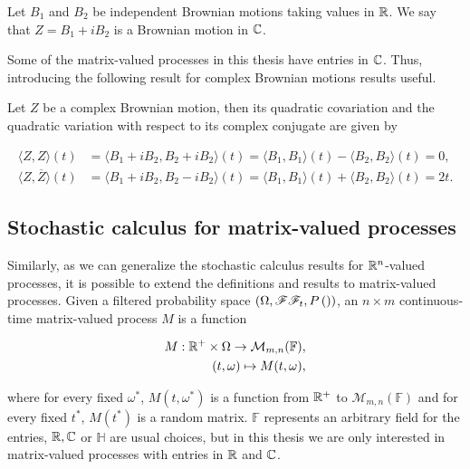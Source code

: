 \begin{example}
    Let $B_1$ and $B_2$ be independent Brownian motions taking values in $\mathbb R$. We say that $Z = B_1 + i B_2$ is a Brownian motion in $\mathbb C$.
\end{example}

Some of the matrix-valued processes in this thesis have entries in $\mathbb C$. Thus, introducing the following result for complex Brownian motions results useful.

\begin{theorem}
    Let $Z$ be a complex Brownian motion, then its quadratic covariation and the quadratic variation with respect to its complex conjugate are given by

    \begin{align*}
        \langle Z, Z \rangle(t) &= \langle B_1 + i B_2, B_2 + i B_2\rangle(t) = \langle B_1, B_1 \rangle(t) - \langle B_2, B_2 \rangle(t) = 0, \\ 
        \langle Z, \overline{Z} \rangle (t) &= \langle B_1 + i B_2, B_2 - i B_2\rangle(t) = \langle B_1, B_1 \rangle(t) + \langle B_2, B_2 \rangle(t) = 2t.
    \end{align*}
\end{theorem}




\subsection{Stochastic calculus for matrix-valued processes}

Similarly, as we can generalize the stochastic calculus results for $\mathbb R^n$-valued processes, it is possible to extend the definitions and results to matrix-valued processes. Given a filtered probability space $(\Omega, \mathscr F \mathscr F_t, P\left( ) \right)$, an $n\times m$ continuous-time matrix-valued process $M$ is a function

\begin{align*}
    M : \mathbb R^+ \times \Omega \to \mathcal M_{m,n}(\mathbb F),\\ 
    (t,\omega) \mapsto M(t,\omega),
\end{align*}

\noindent where for every fixed $\omega^*$, $M(t,\omega^*)$ is a function from $\mathbb R^+$ to $\mathcal M_{m,n}(\mathbb F)$ and for every fixed $t^*$, $M(t^*)$ is a random matrix. $\mathbb F$ represents an arbitrary field for the entries, $\mathbb R, \mathbb C$ or $\mathbb H$ are usual choices, but in this thesis we are only interested in matrix-valued processes with entries in $\mathbb R$ and $\mathbb C$. 

